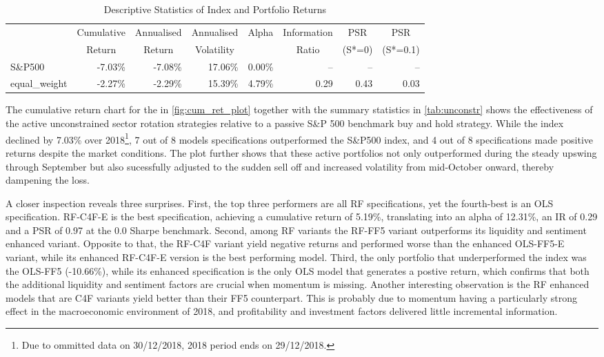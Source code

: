 \begin{table}[ht]
\centering
\caption{Descriptive Statistics of Index and Portfolio Returns}
\label{tab:return_stats_1}
\begin{tabular}{lrrrrrrr}
\toprule
{} & \multicolumn{1}{c}{Cumulative} & \multicolumn{1}{c}{Annualised} & \multicolumn{1}{c}{Annualised} & \multicolumn{1}{c}{Alpha} & \multicolumn{1}{c}{Information} & \multicolumn{1}{c}{PSR} & \multicolumn{1}{c}{PSR} \\
{} & \multicolumn{1}{c}{Return} & \multicolumn{1}{c}{Return} & \multicolumn{1}{c}{Volatility} & {} & \multicolumn{1}{c}{Ratio} & \multicolumn{1}{c}{(S*=0)} & \multicolumn{1}{c}{(S*=0.1)} \\
\midrule
S\&P500 & -7.03\% & -7.08\% & 17.06\% & 0.00\% & -- & -- & -- \\
equal\_weight & -2.27\% & -2.29\% & 15.39\% & 4.79\% & 0.29 & 0.43 & 0.03 \\
\bottomrule
\end{tabular}
\end{table}

The cumulative return chart for the in \cref{fig:cum_ret_plot} together with the summary statistics in \cref{tab:unconstr} shows the effectiveness of the active unconstrained sector rotation strategies relative to a passive S\&P 500 benchmark buy and hold strategy. While the index declined by 7.03\% over 2018\footnote{Due to ommitted data on 30/12/2018, 2018 period ends on 29/12/2018.}, 7 out of 8 models specifications outperformed the S\&P500 index, and 4 out of 8 specifications made positive returns despite the market conditions. The plot further shows that these active portfolios not only outperformed during the steady upswing through September but also sucessfully adjusted to the sudden sell off and increased volatility from mid-October onward, thereby dampening the loss.

A closer inspection reveals three surprises. First, the top three performers are all RF specifications, yet the fourth-best is an OLS specification. RF-C4F-E is the best specification, achieving a cumulative return of 5.19\%, translating into an alpha of 12.31\%, an IR of 0.29 and a PSR of 0.97 at the 0.0 Sharpe benchmark.  Second, among RF variants the RF-FF5 variant outperforms its liquidity and sentiment enhanced variant. Opposite to that, the RF-C4F variant yield negative returns and performed worse than the enhanced OLS-FF5-E variant, while its enhanced RF-C4F-E version is the best performing model. Third,  the only portfolio that underperformed the index was the OLS-FF5 (-10.66\%), while its enhanced specification is the only OLS model that generates a postive return, which confirms that both the additional liquidity and sentiment factors are crucial when momentum is missing. Another interesting observation is the RF enhanced models that are C4F variants yield better than their FF5 counterpart. This is probably due to momentum having a particularly strong effect in the macroeconomic environment of 2018, and profitability and investment factors delivered little incremental information.

